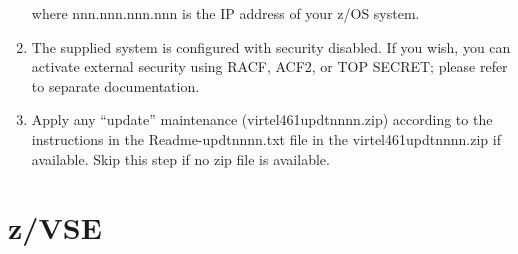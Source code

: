 \documentclass[letterpaper,10pt,english]{sphinxmanual}
\begin{document}
\begin{enumerate}

where nnn.nnn.nnn.nnn is the IP address of your z/OS system.

\item {} 
The supplied system is configured with security disabled. If you wish, you can activate external security using RACF, ACF2, or TOP SECRET; please refer to separate documentation.

\item {} 
Apply any “update” maintenance (virtel461updtnnnn.zip) according to the instructions in the Readme-updtnnnn.txt file in the virtel461updtnnnn.zip if available. Skip this step if no zip file is available.

\end{enumerate}


\section{z/VSE}
\end{document}
